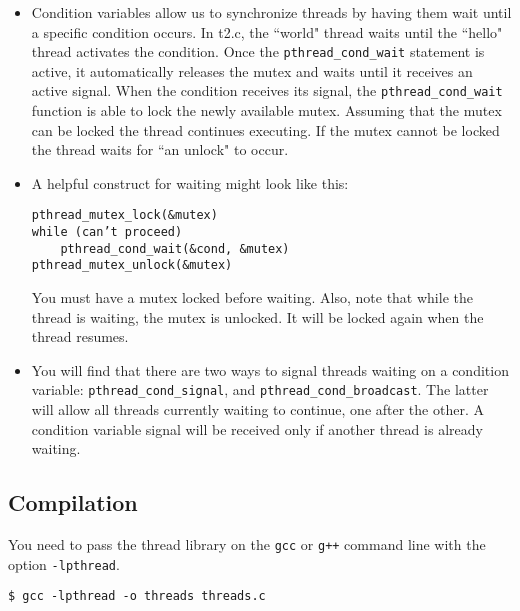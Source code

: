 \documentclass[letterpaper,10pt]{article}
\newcommand{\cmd}[1]{\texttt{#1}}
\begin{document}
\begin{itemize}
\item Condition variables allow us to synchronize threads by having them wait
until a specific condition occurs. In t2.c, the ``world" thread waits until the ``hello"
thread activates the condition. Once the \verb+pthread_cond_wait+ statement is active,
it automatically releases the mutex and waits until it receives an active signal.
When the condition receives its signal, the \verb+pthread_cond_wait+ function is able to
lock the newly available mutex. Assuming that the mutex can be locked the
thread continues executing. If the mutex cannot be locked the thread waits
for ``an unlock" to occur.

\item A helpful construct for waiting might look like this:
\begin{verbatim}
pthread_mutex_lock(&mutex)
while (can’t proceed)
    pthread_cond_wait(&cond, &mutex)
pthread_mutex_unlock(&mutex)
\end{verbatim}
You must have a mutex locked before waiting. Also, note that while the thread
is waiting, the mutex is unlocked. It will be locked again when
the thread resumes.

\item You will find that there are two ways to signal threads waiting on
a condition variable: \verb+pthread_cond_signal+, and \verb+pthread_cond_broadcast+. The latter
will allow all threads currently waiting to continue, one after the other. A
condition variable signal will be received only if another thread is already waiting.

\end{itemize}


\subsection{Compilation}

You need to pass the thread library on the \cmd{gcc} or \cmd{g++}
command line with the option \cmd{-lpthread}.
\begin{verbatim}
$ gcc -lpthread -o threads threads.c
\end{verbatim}
\end{document}
